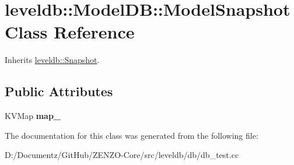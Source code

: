 \hypertarget{classleveldb_1_1_model_d_b_1_1_model_snapshot}{}\section{leveldb\+::Model\+DB\+::Model\+Snapshot Class Reference}
\label{classleveldb_1_1_model_d_b_1_1_model_snapshot}


Inherits \mbox{\hyperlink{classleveldb_1_1_snapshot}{leveldb\+::\+Snapshot}}.

\subsection*{Public Attributes}
\begin{DoxyCompactItemize}
\item 
\mbox{\label{classleveldb_1_1_model_d_b_1_1_model_snapshot_a7ae02397c293072b78874d0c073a10c5}} 
K\+V\+Map {\bfseries map\+\_\+}
\end{DoxyCompactItemize}


The documentation for this class was generated from the following file\+:\begin{DoxyCompactItemize}
\item 
D\+:/\+Documentz/\+Git\+Hub/\+Z\+E\+N\+Z\+O-\/\+Core/src/leveldb/db/db\+\_\+test.\+cc\end{DoxyCompactItemize}
